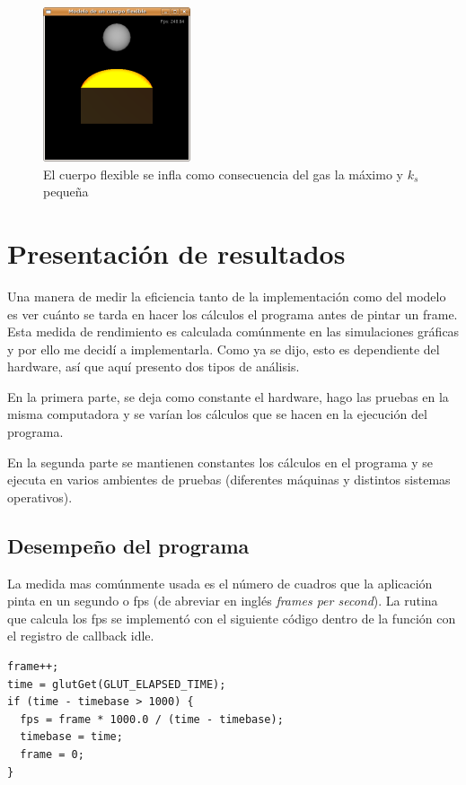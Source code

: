 \begin{figure}
 \centering
 \includegraphics[]{Img/modRes6}
 \caption[Ejecución con fuerza del gas y rigidez pequeña]{El cuerpo flexible se infla como consecuencia del gas la máximo y $k_s$ pequeña}
 \label{res:test6}
\end{figure}

\section{Presentación de resultados}

Una manera de medir la eficiencia tanto de la implementación como del modelo es ver cuánto se tarda en hacer los cálculos el programa antes de pintar un frame. 
Esta medida de rendimiento es calculada comúnmente en las simulaciones gráficas y por ello me decidí a implementarla.
Como ya se dijo, esto es dependiente del hardware, así que aquí presento dos tipos de análisis.

En la primera parte, se deja como constante el hardware, hago las pruebas en la misma computadora y se varían los cálculos que se hacen en la ejecución del programa.

En la segunda parte se mantienen constantes los cálculos en el programa y se ejecuta en varios ambientes de pruebas (diferentes máquinas y distintos sistemas operativos).

\subsection{Desempeño del programa}

La medida mas comúnmente usada es el número de cuadros que la aplicación pinta en un segundo o fps (de abreviar en inglés \emph{\foreignlanguage{english}{frames per second}}).
La rutina que calcula los fps se implementó con el siguiente código dentro de la función con el registro de callback idle.

\begin{verbatim}
frame++;
time = glutGet(GLUT_ELAPSED_TIME);
if (time - timebase > 1000) {
  fps = frame * 1000.0 / (time - timebase);
  timebase = time;
  frame = 0;
}\end{verbatim}

